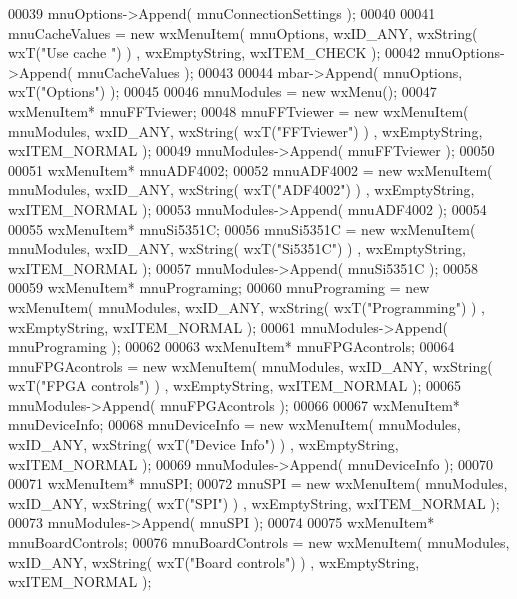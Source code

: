 \begin{DoxyCode}
00039     mnuOptions->Append( mnuConnectionSettings );
00040     
00041     mnuCacheValues = \textcolor{keyword}{new} wxMenuItem( mnuOptions, wxID\_ANY, wxString( wxT(\textcolor{stringliteral}{"Use cache "}) ) , wxEmptyString, 
      wxITEM\_CHECK );
00042     mnuOptions->Append( mnuCacheValues );
00043     
00044     mbar->Append( mnuOptions, wxT(\textcolor{stringliteral}{"Options"}) ); 
00045     
00046     mnuModules = \textcolor{keyword}{new} wxMenu();
00047     wxMenuItem* mnuFFTviewer;
00048     mnuFFTviewer = \textcolor{keyword}{new} wxMenuItem( mnuModules, wxID\_ANY, wxString( wxT(\textcolor{stringliteral}{"FFTviewer"}) ) , wxEmptyString, 
      wxITEM\_NORMAL );
00049     mnuModules->Append( mnuFFTviewer );
00050     
00051     wxMenuItem* mnuADF4002;
00052     mnuADF4002 = \textcolor{keyword}{new} wxMenuItem( mnuModules, wxID\_ANY, wxString( wxT(\textcolor{stringliteral}{"ADF4002"}) ) , wxEmptyString, 
      wxITEM\_NORMAL );
00053     mnuModules->Append( mnuADF4002 );
00054     
00055     wxMenuItem* mnuSi5351C;
00056     mnuSi5351C = \textcolor{keyword}{new} wxMenuItem( mnuModules, wxID\_ANY, wxString( wxT(\textcolor{stringliteral}{"Si5351C"}) ) , wxEmptyString, 
      wxITEM\_NORMAL );
00057     mnuModules->Append( mnuSi5351C );
00058     
00059     wxMenuItem* mnuPrograming;
00060     mnuPrograming = \textcolor{keyword}{new} wxMenuItem( mnuModules, wxID\_ANY, wxString( wxT(\textcolor{stringliteral}{"Programming"}) ) , wxEmptyString, 
      wxITEM\_NORMAL );
00061     mnuModules->Append( mnuPrograming );
00062     
00063     wxMenuItem* mnuFPGAcontrols;
00064     mnuFPGAcontrols = \textcolor{keyword}{new} wxMenuItem( mnuModules, wxID\_ANY, wxString( wxT(\textcolor{stringliteral}{"FPGA controls"}) ) , 
      wxEmptyString, wxITEM\_NORMAL );
00065     mnuModules->Append( mnuFPGAcontrols );
00066     
00067     wxMenuItem* mnuDeviceInfo;
00068     mnuDeviceInfo = \textcolor{keyword}{new} wxMenuItem( mnuModules, wxID\_ANY, wxString( wxT(\textcolor{stringliteral}{"Device Info"}) ) , wxEmptyString, 
      wxITEM\_NORMAL );
00069     mnuModules->Append( mnuDeviceInfo );
00070     
00071     wxMenuItem* mnuSPI;
00072     mnuSPI = \textcolor{keyword}{new} wxMenuItem( mnuModules, wxID\_ANY, wxString( wxT(\textcolor{stringliteral}{"SPI"}) ) , wxEmptyString, wxITEM\_NORMAL );
00073     mnuModules->Append( mnuSPI );
00074     
00075     wxMenuItem* mnuBoardControls;
00076     mnuBoardControls = \textcolor{keyword}{new} wxMenuItem( mnuModules, wxID\_ANY, wxString( wxT(\textcolor{stringliteral}{"Board controls"}) ) , 
      wxEmptyString, wxITEM\_NORMAL );

\end{DoxyCode}
